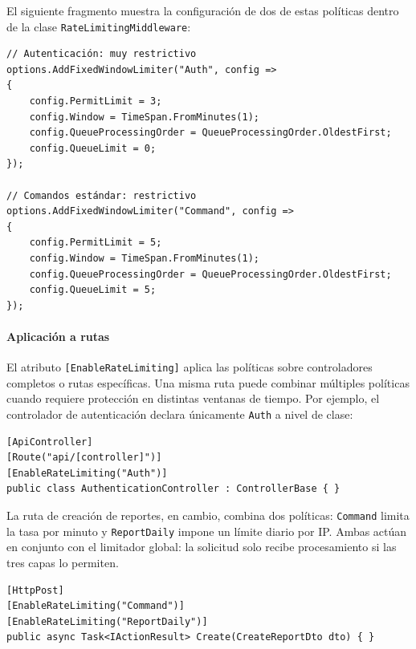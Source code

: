 El siguiente fragmento muestra la configuración de dos de estas políticas dentro de la clase \texttt{RateLimitingMiddleware}:

\begin{lstlisting}[language={[Sharp]C}, caption={Configuración de políticas de rate limiting}, label={lst:ratelimiting}]
// Autenticación: muy restrictivo
options.AddFixedWindowLimiter("Auth", config =>
{
    config.PermitLimit = 3;
    config.Window = TimeSpan.FromMinutes(1);
    config.QueueProcessingOrder = QueueProcessingOrder.OldestFirst;
    config.QueueLimit = 0;
});

// Comandos estándar: restrictivo
options.AddFixedWindowLimiter("Command", config =>
{
    config.PermitLimit = 5;
    config.Window = TimeSpan.FromMinutes(1);
    config.QueueProcessingOrder = QueueProcessingOrder.OldestFirst;
    config.QueueLimit = 5;
});
\end{lstlisting}




\paragraph{Aplicación a rutas}
El atributo \texttt{[EnableRate\-Limiting]} aplica las políticas sobre controladores completos o rutas específicas. Una misma ruta puede combinar múltiples políticas cuando requiere protección en distintas ventanas de tiempo. Por ejemplo, el controlador de autenticación declara únicamente \texttt{Auth} a nivel de clase:

\begin{lstlisting}[language={[Sharp]C}, caption={Aplicación del rate limiting a controladores y rutas}, label={lst:ratelimitingapplication}]
[ApiController]
[Route("api/[controller]")]
[EnableRateLimiting("Auth")]
public class AuthenticationController : ControllerBase { }
\end{lstlisting}

La ruta de creación de reportes, en cambio, combina dos políticas: \texttt{Command} limita la tasa por minuto y \texttt{ReportDaily} impone un límite diario por IP. 
Ambas actúan en conjunto con el limitador global: la solicitud solo recibe procesamiento si las tres capas lo permiten.

\begin{lstlisting}[language={[Sharp]C}, caption={Combinación de políticas en una misma ruta}, label={lst:ratelimitingcombination}]
[HttpPost]
[EnableRateLimiting("Command")]
[EnableRateLimiting("ReportDaily")]
public async Task<IActionResult> Create(CreateReportDto dto) { }
\end{lstlisting}



